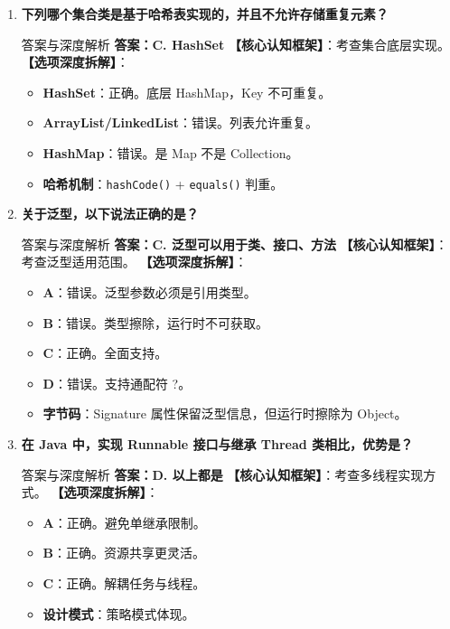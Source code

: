 \documentclass[12pt, a4paper]{ctexart}
\newcommand{\code}[1]{\texttt{\color{myblue}#1}}
\begin{document}
\begin{enumerate}[label=\arabic*.]
	\item \textbf{下列哪个集合类是基于哈希表实现的，并且不允许存储重复元素？}
	      \begin{bluebox}{答案与深度解析}
		      \textbf{答案：C. HashSet}
		      \textbf{【核心认知框架】}：考查集合底层实现。
		      \textbf{【选项深度拆解】}：
		      \begin{itemize}[leftmargin=*, nosep]
			      \item \textbf{HashSet}：正确。底层 HashMap，Key 不可重复。
			      \item \textbf{ArrayList/LinkedList}：错误。列表允许重复。
			      \item \textbf{HashMap}：错误。是 Map 不是 Collection。
			      \item \textbf{哈希机制}：\code{hashCode()} + \code{equals()} 判重。
		      \end{itemize}
	      \end{bluebox}

	\item \textbf{关于泛型，以下说法正确的是？}
	      \begin{bluebox}{答案与深度解析}
		      \textbf{答案：C. 泛型可以用于类、接口、方法}
		      \textbf{【核心认知框架】}：考查泛型适用范围。
		      \textbf{【选项深度拆解】}：
		      \begin{itemize}[leftmargin=*, nosep]
			      \item \textbf{A}：错误。泛型参数必须是引用类型。
			      \item \textbf{B}：错误。类型擦除，运行时不可获取。
			      \item \textbf{C}：正确。全面支持。
			      \item \textbf{D}：错误。支持通配符 ?。
			      \item \textbf{字节码}：Signature 属性保留泛型信息，但运行时擦除为 Object。
		      \end{itemize}
	      \end{bluebox}

	\item \textbf{在 Java 中，实现 Runnable 接口与继承 Thread 类相比，优势是？}
	      \begin{bluebox}{答案与深度解析}
		      \textbf{答案：D. 以上都是}
		      \textbf{【核心认知框架】}：考查多线程实现方式。
		      \textbf{【选项深度拆解】}：
		      \begin{itemize}[leftmargin=*, nosep]
			      \item \textbf{A}：正确。避免单继承限制。
			      \item \textbf{B}：正确。资源共享更灵活。
			      \item \textbf{C}：正确。解耦任务与线程。
			      \item \textbf{设计模式}：策略模式体现。
		      \end{itemize}
	      \end{bluebox}


\end{enumerate}
\end{document}
